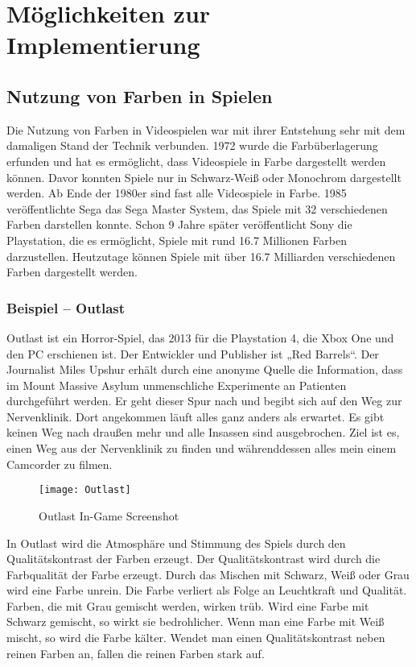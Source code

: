 \chapter{Möglichkeiten zur Implementierung}

\section{Nutzung von Farben in Spielen}
Die Nutzung von Farben in Videospielen war mit ihrer Entstehung sehr mit dem damaligen Stand der Technik verbunden. 1972 wurde die Farbüberlagerung erfunden und hat es ermöglicht, dass Videospiele in Farbe dargestellt werden können. Davor konnten Spiele nur in Schwarz-Weiß oder Monochrom dargestellt werden. Ab Ende der 1980er sind fast alle Videospiele in Farbe. 1985 veröffentlichte Sega das Sega Master System, das Spiele mit 32 verschiedenen Farben darstellen konnte. Schon 9 Jahre später veröffentlicht Sony die Playstation, die es ermöglicht, Spiele mit rund 16.7 Millionen Farben darzustellen. Heutzutage können Spiele mit über 16.7 Milliarden verschiedenen Farben dargestellt werden. 
\cite{_the_video_game_explosion}

\subsection{Beispiel – Outlast}
Outlast ist ein Horror-Spiel, das 2013 für die Playstation 4, die Xbox One und den PC erschienen ist. Der Entwickler und Publisher ist „Red Barrels“. Der Journalist Miles Upshur erhält durch eine anonyme Quelle die Information, dass im Mount Massive Asylum unmenschliche Experimente an Patienten durchgeführt werden. Er geht dieser Spur nach und begibt sich auf den Weg zur Nervenklinik. Dort angekommen läuft alles ganz anders als erwartet. Es gibt keinen Weg nach draußen mehr und alle Insassen sind ausgebrochen. Ziel ist es, einen Weg aus der Nervenklinik zu finden und währenddessen alles mein einem Camcorder zu filmen. 
\cite{_outlast}

\begin{figure}[H]
	\centering
	\texttt{[image: Outlast]}
	\caption{Outlast In-Game Screenshot\cite{_drawing_basics_and_video_game_art}}
\end{figure}

In Outlast wird die Atmosphäre und Stimmung des Spiels durch den Qualitätskontrast der Farben erzeugt. Der Qualitätskontrast wird durch die Farbqualität der Farbe erzeugt. Durch das Mischen mit Schwarz, Weiß oder Grau wird eine Farbe unrein. Die Farbe verliert als Folge an Leuchtkraft und Qualität. Farben, die mit Grau gemischt werden, wirken trüb. Wird eine Farbe mit Schwarz gemischt, so wirkt sie bedrohlicher. Wenn man eine Farbe mit Weiß mischt, so wird die Farbe kälter. Wendet man einen Qualitätskontrast neben reinen Farben an, fallen die reinen Farben stark auf. 
\cite{_farbkontraste}
\cite{_outlast}

